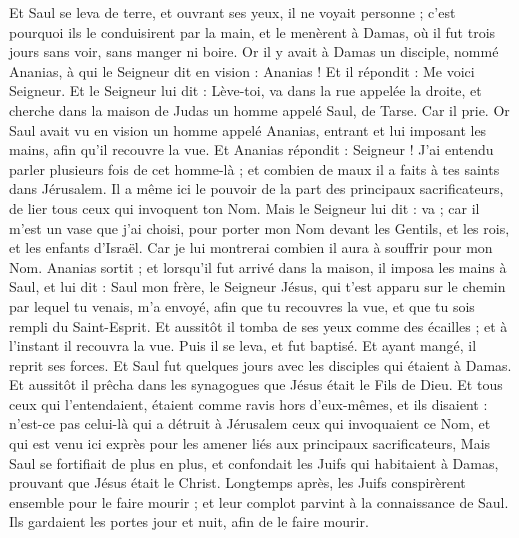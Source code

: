 \begin{multicols}{2}
{Et Saul se leva de terre, et ouvrant ses yeux, il ne voyait personne ; c'est pourquoi ils le conduisirent par la main, et le menèrent à Damas,
où il fut trois jours sans voir, sans manger ni boire.
Or il y avait à Damas un disciple, nommé Ananias, à qui le Seigneur dit en vision : Ananias ! Et il répondit : Me voici Seigneur.
Et le Seigneur lui dit : Lève-toi, va dans la rue appelée la droite, et cherche dans la maison de Judas un homme appelé Saul, de Tarse.
Car il prie. Or Saul avait vu en vision un homme appelé Ananias, entrant et lui imposant les mains, afin qu'il recouvre la vue.
Et Ananias répondit : Seigneur ! J'ai entendu parler plusieurs fois de cet homme-là ; et combien de maux il a faits à tes saints dans Jérusalem.
Il a même ici le pouvoir de la part des principaux sacrificateurs, de lier tous ceux qui invoquent ton Nom.
 Mais le Seigneur lui dit : va ; car il m'est un vase que j'ai choisi, pour porter mon Nom devant les Gentils, et les rois, et les enfants d'Israël.
Car je lui montrerai combien il aura à souffrir pour mon Nom.
Ananias sortit ; et lorsqu'il fut arrivé dans la maison, il imposa les mains à Saul, et lui dit : Saul mon frère, le Seigneur Jésus, qui t'est apparu sur le chemin par lequel tu venais, m'a envoyé, afin que tu recouvres la vue, et que tu sois rempli du Saint-Esprit.
Et aussitôt il tomba de ses yeux comme des écailles ; et à l'instant il recouvra la vue. Puis il se leva, et fut baptisé.
Et ayant mangé, il reprit ses forces. Et Saul fut quelques jours avec les disciples qui étaient à Damas.
Et aussitôt il prêcha dans les synagogues que Jésus était le Fils de Dieu.
Et tous ceux qui l'entendaient, étaient comme ravis hors d'eux-mêmes, et ils disaient : n'est-ce pas celui-là qui a détruit à Jérusalem ceux qui invoquaient ce Nom, et qui est venu ici exprès pour les amener liés aux principaux sacrificateurs,
Mais Saul se fortifiait de plus en plus, et confondait les Juifs qui habitaient à Damas, prouvant que Jésus était le Christ.
Longtemps après, les Juifs conspirèrent ensemble pour le faire mourir ;
et leur complot parvint à la connaissance de Saul. Ils gardaient les portes jour et nuit, afin de le faire mourir.
}
\end{multicols}
